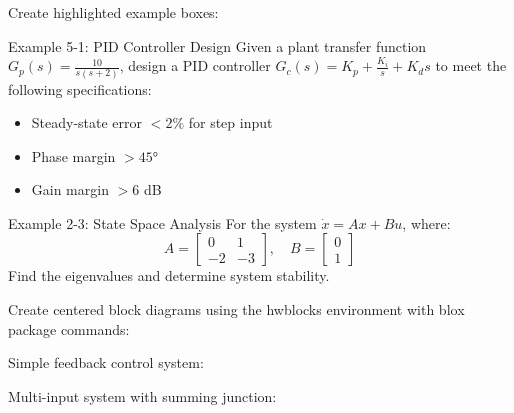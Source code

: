 \documentclass{homework}
\begin{document}

Create highlighted example boxes:

\begin{example}{Example 5-1: PID Controller Design}
Given a plant transfer function $G_p(s) = \frac{10}{s(s+2)}$, design a PID controller 
$G_c(s) = K_p + \frac{K_i}{s} + K_d s$ to meet the following specifications:
\begin{itemize}
\item Steady-state error $< 2\%$ for step input
\item Phase margin $> 45°$
\item Gain margin $> 6$ dB
\end{itemize}
\end{example}

\begin{example}{Example 2-3: State Space Analysis}
For the system $\dot{x} = Ax + Bu$, where:
$$A = \begin{bmatrix} 0 & 1 \\ -2 & -3 \end{bmatrix}, \quad B = \begin{bmatrix} 0 \\ 1 \end{bmatrix}$$
Find the eigenvalues and determine system stability.
\end{example}


Create centered block diagrams using the hwblocks environment with blox package commands:

\subproblem
Simple feedback control system:

\begin{hwblocks}[scale=0.85]
\end{hwblocks}

\subproblem
Multi-input system with summing junction:

\begin{hwblocks}[scale=0.8]
\end{hwblocks}
\end{document}

